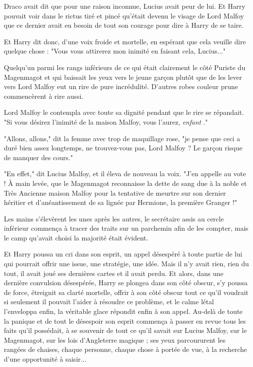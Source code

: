 Draco avait dit que pour une raison inconnue, Lucius avait peur de lui. Et Harry pouvait voir dans le rictus tiré et pincé qu'était devenu le visage de Lord Malfoy que ce dernier avait eu besoin de tout son courage pour dire à Harry de se taire.

Et Harry dit donc, d'une voix froide et mortelle, en espérant que cela veuille dire quelque chose : "Vous vous attirerez mon inimité en faisant cela, Lucius..."

Quelqu'un parmi les rangs inférieurs de ce qui était clairement le côté Puriste du Magenmagot et qui baissait les yeux vers le jeune garçon plutôt que de les lever vers Lord Malfoy eut un rire de pure incrédulité. D'autres robes couleur prune commencèrent à rire aussi.

Lord Malfoy le contempla avec toute sa dignité pendant que le rire se répandait. "Si vous désirez l'inimité de la maison Malfoy, vous l'aurez, \emph{enfant} ."

"Allons, allons," dit la femme avec trop de maquillage rose, "je pense que ceci a duré bien assez longtemps, ne trouvez-vous pas, Lord Malfoy ? Le garçon risque de manquer des cours."

"En effet," dit Lucius Malfoy, et il éleva de nouveau la voix. "J'en appelle au vote ! À main levée, que le Magenmagot reconnaisse la dette de sang due à la noble et Très Ancienne maison Malfoy pour la tentative de meurtre sur son dernier héritier et d'anéantissement de sa lignée par Hermione, la première Granger !"

Les mains s'élevèrent les unes après les autres, le secrétaire assis au cercle inférieur commença à tracer des traits sur un parchemin afin de les compter, mais le camp qu'avait choisi la majorité était évident.

Et Harry poussa un cri dans son esprit, un appel désespéré à toute partie de lui qui pourrait offrir une issue, une stratégie, une idée. Mais il n'y avait rien, rien du tout, il avait joué ses dernières cartes et il avait perdu. Et alors, dans une dernière convulsion désespérée, Harry se plongea dans son côté obscur, s'y poussa de force, étreignit sa clarté mortelle, offrir à son côté obscur tout ce qu'il voudrait si seulement il pouvait l'aider à résoudre ce problème, et le calme létal l'enveloppa enfin, la véritable glace répondit enfin à son appel. Au-delà de toute la panique et de tout le désespoir son esprit commença à passer en revue tous les faits qu'il possédait, à se souvenir de tout ce qu'il savait sur Lucius Malfoy, sur le Magenmagot, sur les lois d'Angleterre magique ; ses yeux parcoururent les rangées de chaises, chaque personne, chaque chose à portée de vue, à la recherche d'une opportunité à saisir...

